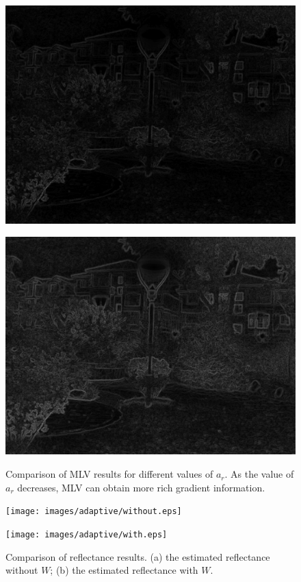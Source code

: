 \begin{figure}[t]
\centering
\begin{minipage}[b]{0.49\hsize}
\centering
\includegraphics[height=0.65\hsize]{images/noise/MLV_10.eps}
 \label{fig:mlv_normal}
\end{minipage}
\begin{minipage}[b]{0.49\hsize}
\centering
\includegraphics[height=0.65\hsize]{images/noise/MLV_05.eps}
 \label{fig:mlv_pow}
\end{minipage}
\caption{Comparison of MLV results for different values of $a_{r}$. As the value of $a_{r}$ decreases, MLV can obtain more rich gradient information.}
\label{fig:mlv_change}
\end{figure}
\begin{figure}[t]
\centering
\begin{minipage}[b]{0.49\hsize}
\centering
\texttt{[image: images/adaptive/without.eps]}
 \label{fig:wo}
\end{minipage}
\begin{minipage}[b]{0.49\hsize}
\centering
\texttt{[image: images/adaptive/with.eps]}
 \label{fig:w}
\end{minipage}
\caption{Comparison of reflectance results. (a) the estimated reflectance without $W$; (b) the estimated reflectance with $W$.}
\label{fig:adaptive/effectiveness}
\end{figure}
